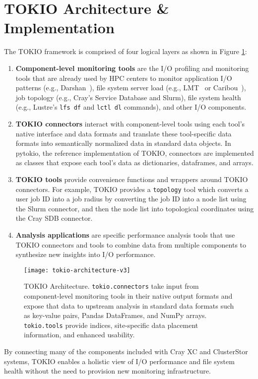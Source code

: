 \section{TOKIO Architecture \& Implementation}

The TOKIO framework is comprised of four logical layers as shown in Figure \ref{fig:tokio-architecture}:

\begin{enumerate}
\item \textbf{Component-level monitoring tools} are the I/O profiling and monitoring tools that are already used by HPC centers to monitor application I/O patterns (e.g., Darshan~\cite{Carns2009}), file system server load (e.g., LMT~\cite{Keopp2014} or Caribou~\cite{Flaskerud2017}), job topology (e.g., Cray's Service Database and Slurm), file system health (e.g., Lustre's \texttt{lfs df} and \texttt{lctl dl} commands), and other I/O components.
\item \textbf{TOKIO connectors} interact with component-level tools using each tool's native interface and data formats and translate these tool-specific data formats into semantically normalized data in standard  data objects.  In pytokio, the reference implementation of TOKIO, connectors are implemented as classes that expose each tool's data as dictionaries, dataframes, and arrays.
\item \textbf{TOKIO tools} provide convenience functions and wrappers around TOKIO connectors.  For example, TOKIO provides a \texttt{topology} tool which converts a user job ID into a job radius by converting the job ID into a node list using the Slurm connector, and then the node list into topological coordinates using the Cray SDB connector.
\item \textbf{Analysis applications} are specific performance analysis tools that use TOKIO connectors and tools to combine data from multiple components to synthesize new insights into I/O performance.
\end{enumerate}

\begin{figure}[t]
    \centering
    \texttt{[image: tokio-architecture-v3]}
    \vspace{-.3in}
    \caption{TOKIO Architecture.  \texttt{tokio.connectors} take input from component-level monitoring tools in their native output formats and expose that data to upstream analysis in standard data formats such as key-value pairs, Pandas DataFrames, and NumPy arrays. \texttt{tokio.tools} provide indices, site-specific data placement information, and enhanced usability.}
    \label{fig:tokio-architecture}
    \vspace{-.2in}
\end{figure}

By connecting many of the components included with Cray XC and ClusterStor systems, TOKIO enables a holistic view of I/O performance and file system health without the need to provision new monitoring infrastructure.